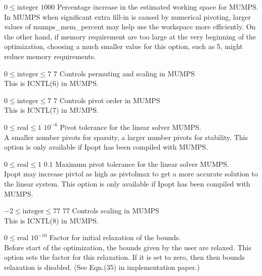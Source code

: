 %
{$0\leq\textrm{integer}$}%
{$1000$}%
{Percentage increase in the estimated working space for MUMPS.\\
In MUMPS when significant extra fill-in is caused by numerical pivoting, larger values of mumps\_mem\_percent may help use the workspace more efficiently.  On the other hand, if memory requirement are too large at the very beginning of the optimization, choosing a much smaller value for this option, such as 5, might reduce memory requirements.}%
{}

%
{$0\leq\textrm{integer}\leq7$}%
{$7$}%
{Controls permuting and scaling in MUMPS\\
This is ICNTL(6) in MUMPS.}%
{}

%
{$0\leq\textrm{integer}\leq7$}%
{$7$}%
{Controls pivot order in MUMPS\\
This is ICNTL(7) in MUMPS.}%
{}

%
{$0\leq\textrm{real}\leq1$}%
{$10^{- 6}$}%
{Pivot tolerance for the linear solver MUMPS.\\
A smaller number pivots for sparsity, a larger number pivots for stability.  This option is only available if Ipopt has been compiled with MUMPS.}%
{}

%
{$0\leq\textrm{real}\leq1$}%
{$0.1$}%
{Maximum pivot tolerance for the linear solver MUMPS.\\
Ipopt may increase pivtol as high as pivtolmax to get a more accurate solution to the linear system.  This option is only available if Ipopt has been compiled with MUMPS.}%
{}

%
{$-2\leq\textrm{integer}\leq77$}%
{$77$}%
{Controls scaling in MUMPS\\
This is ICNTL(8) in MUMPS.}%
{}

%
{$0\leq\textrm{real}$}%
{$10^{-10}$}%
{Factor for initial relaxation of the bounds.\\
Before start of the optimization, the bounds given by the user are relaxed.  This option sets the factor for this relaxation.  If it is set to zero, then then bounds relaxation is disabled. (See Eqn.(35) in implementation paper.)}%
{}


